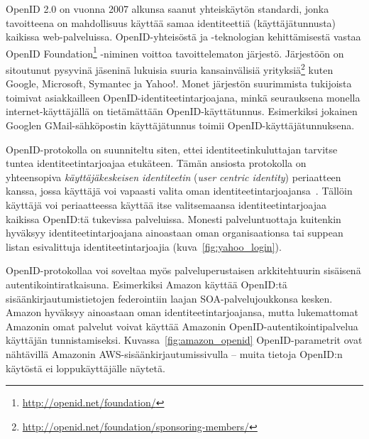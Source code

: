 \documentclass[finnish,gradu]{tktltiki}
\begin{document}


  OpenID 2.0 on vuonna 2007 alkunsa saanut yhteiskäytön standardi, jonka tavoitteena on mahdollisuus käyttää samaa identiteettiä (käyttäjätunnusta) kaikissa web-palveluissa. OpenID-yhteisöstä ja -teknologian kehittämisestä vastaa OpenID Foundation\footnote{\url{http://openid.net/foundation/}} -niminen voittoa tavoittelematon järjestö. Järjestöön on sitoutunut pysyvinä jäseninä lukuisia suuria kansainvälisiä yrityksiä\footnote{\url{http://openid.net/foundation/sponsoring-members/}} kuten Google, Microsoft, Symantec ja Yahoo!. Monet järjestön suurimmista tukijoista toimivat asiakkailleen OpenID-identiteetintarjoajana, minkä seurauksena monella internet-käyttäjällä on tietämättään OpenID-käyttätunnus. Esimerkiksi jokainen Googlen GMail-sähköpostin käyttäjätunnus toimii  OpenID-käyttäjätunnuksena.

  OpenID-protokolla on suunniteltu siten, ettei identiteetinkuluttajan tarvitse tuntea identiteetintarjoajaa etukäteen. Tämän ansiosta protokolla on yhteensopiva \emph{käyttäjäkeskeisen identiteetin} (\emph{user centric identity}) periaatteen kanssa, jossa käyttäjä voi vapaasti valita oman identiteetintarjoajansa~\cite{openid_recordon_2009}. Tällöin käyttäjä voi periaatteessa käyttää itse valitsemaansa identiteetintarjoajaa kaikissa OpenID:tä tukevissa palveluissa.
  Monesti palveluntuottaja kuitenkin hyväksyy identiteetintarjoajana ainoastaan oman organisaationsa tai suppean listan esivalittuja identiteetintarjoajia (kuva~\ref{fig:yahoo_login}).

  OpenID-protokollaa voi soveltaa myös palveluperustaisen arkkitehtuurin sisäisenä autentikointiratkaisuna. Esimerkiksi Amazon käyttää OpenID:tä sisäänkirjautumistietojen federointiin laajan SOA-palvelujoukkonsa kesken. Amazon hyväksyy ainoastaan oman identiteetintarjoajansa, mutta lukemattomat Amazonin omat palvelut voivat käyttää Amazonin OpenID-autentikointipalvelua käyttäjän tunnistamiseksi.  Kuvassa~\ref{fig:amazon_openid} OpenID-parametrit ovat nähtävillä Amazonin AWS-sisäänkirjautumissivulla -- muita tietoja OpenID:n käytöstä ei loppukäyttäjälle näytetä.
\end{document}
